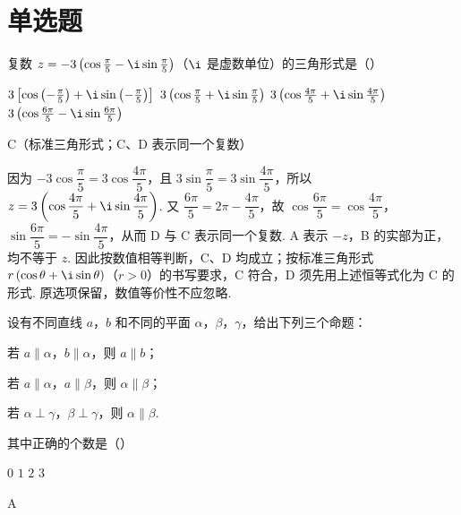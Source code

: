 \section{单选题}

\begin{problem}
复数 \(z = -3\left(\cos \frac{\pi}{5} - \i\sin \frac{\pi}{5}\right)\)（\(\i\) 是虚数单位）的三角形式是（\quad）

\choices
    {\(3\left[\cos \left(-\frac{\pi}{5}\right) + \i\sin \left(-\frac{\pi}{5}\right)\right]\)}
    {\(3\left(\cos\frac{\pi}{5}+\i\sin\frac{\pi}{5}\right)\)}
    {\(3\left(\cos\frac{4\pi}{5}+\i\sin\frac{4\pi}{5}\right)\)}
    {\(3\left(\cos \frac{6\pi}{5} -\i\sin \frac{6\pi}{5}\right)\)}
\end{problem}

\begin{answer}
C（标准三角形式；C、D 表示同一个复数）
\end{answer}

\begin{solution}
因为 \(-3\cos\dfrac{\pi}{5}=3\cos\dfrac{4\pi}{5}\)，且 \(3\sin\dfrac{\pi}{5}=3\sin\dfrac{4\pi}{5}\)，所以
\(z=3\left(\cos\dfrac{4\pi}{5}+\i\sin\dfrac{4\pi}{5}\right)\). 又 \(\dfrac{6\pi}{5}=2\pi-\dfrac{4\pi}{5}\)，故 \(\cos\dfrac{6\pi}{5}=\cos\dfrac{4\pi}{5}\)，\(\sin\dfrac{6\pi}{5}=-\sin\dfrac{4\pi}{5}\)，从而 D 与 C 表示同一个复数. A 表示 \(-z\)，B 的实部为正，均不等于 \(z\). 因此按数值相等判断，C、D 均成立；按标准三角形式 \(r\left(\cos\theta+\i\sin\theta\right)\)（\(r>0\)）的书写要求，C 符合，D 须先用上述恒等式化为 C 的形式. 原选项保留，数值等价性不应忽略.
\end{solution}

\begin{problem}
设有不同直线 \(a\)，\(b\) 和不同的平面 \(\alpha\)，\(\beta\)，\(\gamma\)，给出下列三个命题：
\begin{circlelist}
\item 若 \(a \parallel \alpha\)，\(b \parallel \alpha\)，则 \(a \parallel b\)；
\item 若 \(a \parallel \alpha\)，\(a \parallel \beta\)，则 \(\alpha \parallel \beta\)；
\item 若 \(\alpha \perp \gamma\)，\(\beta \perp \gamma\)，则 \(\alpha \parallel \beta\).
\end{circlelist}
其中正确的个数是（\quad）

\choices
    {\(0\)}
    {\(1\)}
    {\(2\)}
    {\(3\)}
\end{problem}

\begin{answer}
A
\end{answer}

